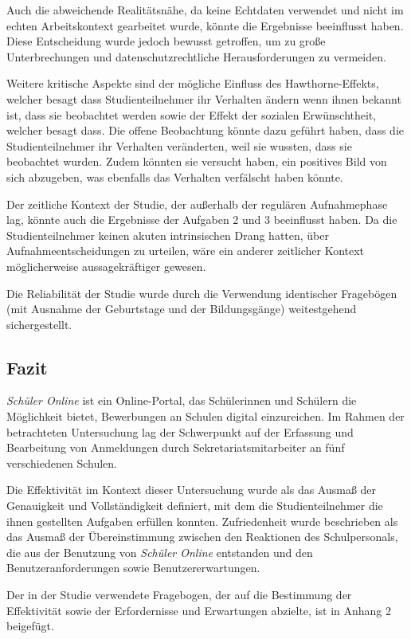 Auch die abweichende Realitätsnähe, da keine Echtdaten verwendet und nicht im echten Arbeitskontext gearbeitet wurde, könnte die Ergebnisse beeinflusst haben. Diese Entscheidung wurde jedoch bewusst getroffen, um zu große Unterbrechungen und datenschutzrechtliche Herausforderungen zu vermeiden.

Weitere kritische Aspekte sind der mögliche Einfluss des Hawthorne-Effekts, welcher besagt dass Studienteilnehmer ihr Verhalten ändern wenn ihnen bekannt ist, dass sie beobachtet werden sowie der Effekt der sozialen Erwünschtheit, welcher besagt dass. Die offene Beobachtung könnte dazu geführt haben, dass die Studienteilnehmer ihr Verhalten veränderten, weil sie wussten, dass sie beobachtet wurden. Zudem könnten sie versucht haben, ein positives Bild von sich abzugeben, was ebenfalls das Verhalten verfälscht haben könnte.

Der zeitliche Kontext der Studie, der außerhalb der regulären Aufnahmephase lag, könnte auch die Ergebnisse der Aufgaben 2 und 3 beeinflusst haben. Da die Studienteilnehmer keinen akuten intrinsischen Drang hatten, über Aufnahmeentscheidungen zu urteilen, wäre ein anderer zeitlicher Kontext möglicherweise aussagekräftiger gewesen.

Die Reliabilität der Studie wurde durch die Verwendung identischer Fragebögen (mit Ausnahme der Geburtstage und der Bildungsgänge) weitestgehend sichergestellt.

\subsection{Fazit}

\textit{Schüler Online} ist ein Online-Portal, das Schülerinnen und Schülern die Möglichkeit bietet, Bewerbungen an Schulen digital einzureichen. Im Rahmen der betrachteten Untersuchung lag der Schwerpunkt auf der Erfassung und Bearbeitung von Anmeldungen durch Sekretariatsmitarbeiter an fünf verschiedenen Schulen.

Die Effektivität im Kontext dieser Untersuchung wurde als das Ausmaß der Genauigkeit und Vollständigkeit definiert, mit dem die Studienteilnehmer die ihnen gestellten Aufgaben erfüllen konnten. Zufriedenheit wurde beschrieben als das Ausmaß der Übereinstimmung zwischen den Reaktionen des Schulpersonals, die aus der Benutzung von \textit{Schüler Online} entstanden und den Benutzeranforderungen sowie Benutzererwartungen.

Der in der Studie verwendete Fragebogen, der auf die Bestimmung der Effektivität sowie der Erfordernisse und Erwartungen abzielte, ist in Anhang 2 beigefügt.

